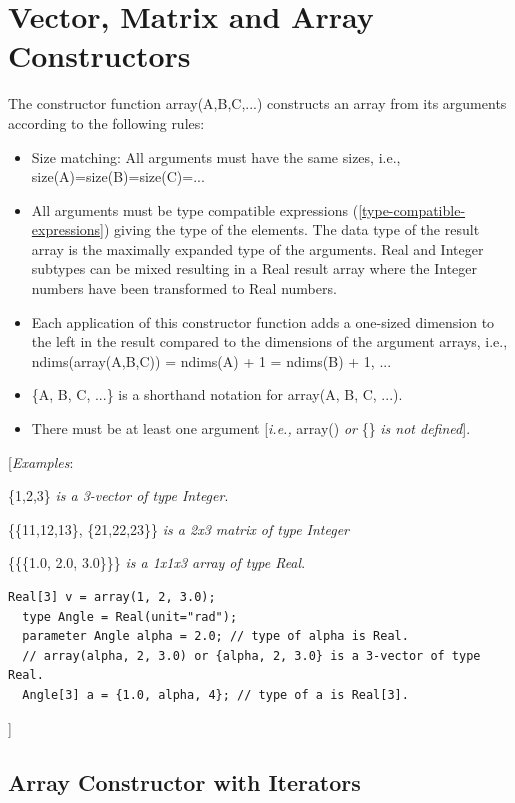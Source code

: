 \documentclass[10pt,a4paper]{report}
\def\doublelabel#1{\label{#1}\hypertarget{#1}{}}
\begin{document}
\section{Vector, Matrix and Array Constructors}\doublelabel{vector-matrix-and-array-constructors}

The constructor function array(A,B,C,...) constructs an array from its
arguments according to the following rules:

\begin{itemize}
\item
  Size matching: All arguments must have the same sizes, i.e.,
  size(A)=size(B)=size(C)=...
\item
  All arguments must be type compatible expressions (\ref{type-compatible-expressions}) giving
  the type of the elements. The data type of the result array is the
  maximally expanded type of the arguments. Real and Integer subtypes
  can be mixed resulting in a Real result array where the Integer
  numbers have been transformed to Real numbers.
\item
  Each application of this constructor function adds a one-sized
  dimension to the left in the result compared to the dimensions of the
  argument arrays, i.e., ndims(array(A,B,C)) = ndims(A) + 1 = ndims(B) +
  1, ...
\item
  \{A, B, C, ...\} is a shorthand notation for array(A, B, C, ...).
\item
  There must be at least one argument {[}\emph{i.e.,} array() \emph{or}
  \{\} \emph{is not defined}{]}.
\end{itemize}

{[}\emph{Examples}:

\{1,2,3\} \emph{is a 3-vector of type Integer}.

\{\{11,12,13\}, \{21,22,23\}\} \emph{is a 2x3 matrix of type Integer}

\{\{\{1.0, 2.0, 3.0\}\}\} \emph{is a 1x1x3 array of type Real}.

\begin{lstlisting}[language=modelica]
  Real[3] v = array(1, 2, 3.0);
  type Angle = Real(unit="rad");
  parameter Angle alpha = 2.0; // type of alpha is Real.
  // array(alpha, 2, 3.0) or {alpha, 2, 3.0} is a 3-vector of type Real.
  Angle[3] a = {1.0, alpha, 4}; // type of a is Real[3].
\end{lstlisting}
{]}

\subsection{Array Constructor with Iterators}\doublelabel{array-constructor-with-iterators}
\end{document}
